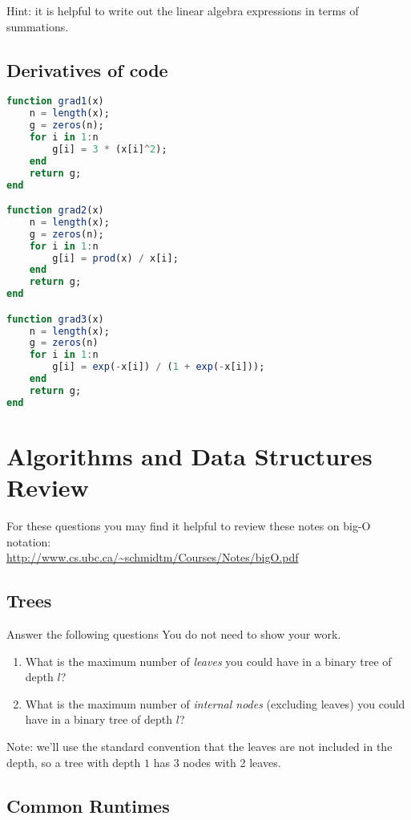 \documentclass{article}
\def\blu#1{{\color{blu}#1}}
\begin{document}
Hint: it is helpful to write out the linear algebra expressions in terms of summations.



\subsection{Derivatives of code}

\begin{lstlisting}[language=julia, frame=single]
function grad1(x)
	n = length(x);
	g = zeros(n);
	for i in 1:n
		g[i] = 3 * (x[i]^2);
	end
	return g;
end

function grad2(x)
	n = length(x);
	g = zeros(n);
	for i in 1:n
		g[i] = prod(x) / x[i];
	end
	return g;
end

function grad3(x)
	n = length(x);
	g = zeros(n)
	for i in 1:n
		g[i] = exp(-x[i]) / (1 + exp(-x[i]));
	end
	return g;
end
\end{lstlisting}

\section{Algorithms and Data Structures Review}

For these questions you may find it helpful to review these notes on big-O notation:\\
\url{http://www.cs.ubc.ca/~schmidtm/Courses/Notes/bigO.pdf}

\subsection{Trees}

\blu{Answer the following questions} You do not need to show your work.
\begin{enumerate}
\item What is the maximum number of \emph{leaves} you could have in a binary tree of depth $l$?
\item What is the maximum number of \emph{internal nodes} (excluding leaves) you could have in a binary tree of depth $l$?
\end{enumerate}
Note: we'll use the standard convention that the leaves are not included in the depth, so a tree with depth $1$ has 3 nodes with 2 leaves.


\subsection{Common Runtimes}
\end{document}
